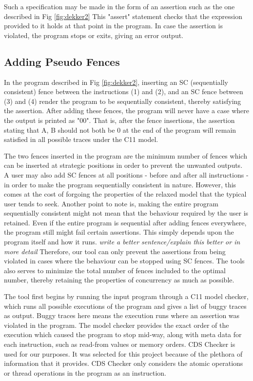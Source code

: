 \par
Such a specification may be made in the form of an assertion such as the one described in Fig \ref{fig:dekker2} This "assert" statement checks that the expression provided to it holds at that point in the program. In case the assertion is violated, the program stops or exits, giving an error output. 

\subsection{Adding Pseudo Fences}
In the program described in Fig \ref{fig:dekker2}, inserting an SC (sequentially consistent) fence between the instructions (1) and (2), and an SC fence between (3) and (4) render the program to be sequentially consistent, thereby satisfying the assertion. After adding these fences, the program will never have a case where the output is printed as "00". That is, after the fence insertions, the assertion stating that A, B should not both be 0 at the end of the program will remain satisfied in all possible traces under the C11 model.

\par
The two fences inserted in the program are the minimum number of fences which can be inserted at strategic positions in order to prevent the unwanted outputs. A user may also add SC fences at all positions - before and after all instructions - in order to make the program sequentially consistent in nature. However, this comes at the cost of forgoing the properties of the relaxed model that the typical user tends to seek. Another point to note is, making the entire program sequentially consistent might not mean that the behaviour required by the user is retained. Even if the entire program is sequential after adding fences everywhere, the program still might fail certain assertions. This simply depends upon the program itself and how it runs. \textit{\color{pink}write a better sentence/explain this better or in more detail} Therefore, our tool can only prevent the assertions from being violated in cases where the behaviour can be stopped using SC fences. The tools also serves to minimize the total number of fences included to the optimal number, thereby retaining the properties of concurrency as much as possible.

\par
The tool first begins by running the input program through a C11 model checker, which runs all possible executions of the program and gives a list of buggy traces as output. Buggy traces here means the execution runs where an assertion was violated in the program. The model checker provides the exact order of the execution which caused the program to stop mid-way, along with meta data for each instruction, such as read-from values or memory orders. CDS Checker is used for our purposes. It was selected for this project because of the plethora of information that it provides. CDS Checker only considers the atomic operations or thread operations in the program as an instruction.

